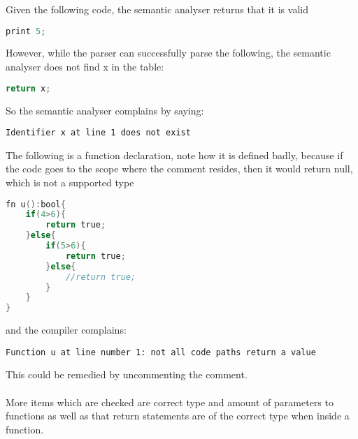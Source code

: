 Given the following code, the semantic analyser returns that it is valid
\begin{lstlisting}[language=C]
print 5;
\end{lstlisting}

However, while the parser can successfully parse the following, the semantic analyser does not find x in the table:
\begin{lstlisting}[language=C]
return x;
\end{lstlisting}
So the semantic analyser complains by saying:
\begin{lstlisting}[numbers=none]
Identifier x at line 1 does not exist
\end{lstlisting}

The following is a function declaration, note how it is defined badly, because if the code goes to the scope where the comment resides, then it would return null, which is not a supported type
\begin{lstlisting}[language=C]
fn u():bool{
	if(4>6){
		return true;
	}else{
		if(5>6){
			return true;
		}else{
			//return true;
		}
	}
}
\end{lstlisting}
and the compiler complains:
\begin{lstlisting}[numbers=none]
Function u at line number 1: not all code paths return a value
\end{lstlisting}
This could be remedied by uncommenting the comment.
\\\\
More items which are checked are correct type and amount of parameters to functions as well as that return statements are of the correct type when inside a function.